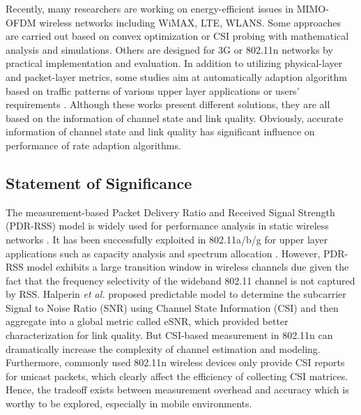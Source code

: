 \documentclass[draftclsnofoot,conference,onecolumn,11pt]{IEEEtran}
\begin{document}
Recently, many researchers are working on energy-efficient issues in MIMO-OFDM wireless networks including WiMAX, LTE, WLANS. Some approaches are carried out based on convex optimization \cite{5510775} or CSI probing \cite{6214414} with mathematical analysis and simulations. Others are designed for 3G \cite{Peng:2011:TPS:2030613.2030628} or 802.11n \cite{Li:2012:ERA:2348543.2348585} \cite{Zhang:2011:EEI:2030613.2030637} networks by practical implementation and evaluation. In addition to utilizing physical-layer and packet-layer metrics, some studies aim at automatically adaption algorithm based on traffic patterns of various upper layer applications \cite{Han:2012:DPW:2307636.2307675} \cite{Jang:2011:SEM:2079296.2079308} or users' requirements \cite{Zhuang:2010:IEE:1814433.1814464} \cite{Schulman:2010:BPA:1859995.1860006}. Although these works present different solutions, they are all based on the information of channel state and link quality. Obviously, accurate information of channel state and link quality has significant influence on performance of rate adaption algorithms.

\subsection{Statement of Significance}

The measurement-based Packet Delivery Ratio and Received Signal Strength (PDR-RSS) model is widely used for performance analysis in static wireless networks \cite{reis2006model}. It has been successfully exploited in 802.11a/b/g for upper layer applications such as capacity analysis \cite{kashyap2007capacity} and spectrum allocation \cite{k.rayanchu:fluid:}. However, PDR-RSS model exhibits a large transition window in wireless channels due given the fact that the frequency selectivity of the wideband 802.11 channel is not captured by RSS. Halperin \textit{et al.} \cite{Halperin2010predictable} proposed predictable model to determine the subcarrier Signal to Noise Ratio (SNR) using Channel State Information (CSI) and then aggregate into a global metric called eSNR, which provided better characterization for link quality. But CSI-based measurement in 802.11n can dramatically increase the complexity of channel estimation and modeling. Furthermore, commonly used 802.11n wireless devices only provide CSI reports for unicast packets, which clearly affect the efficiency of collecting CSI matrices. Hence, the tradeoff exists between measurement overhead and accuracy which is worthy to be explored, especially in mobile environments.
\end{document}
